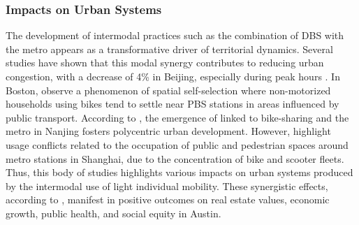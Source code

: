 \begin{refsegment}
\subsubsection*{Impacts on Urban Systems
    \label{chap2:impacts-urbain}
    }

The development of intermodal practices such as the combination of \acrshort{DBS} with the metro appears as a transformative driver of territorial dynamics. Several studies have shown that this modal synergy contributes to reducing urban congestion, with a decrease of 4\% in Beijing, especially during peak hours \textcolor{blue}{\autocite[12]{fan_dockless_2020}}. In Boston, \textcolor{blue}{\autocite[13]{basu_planning_2021}} observe a phenomenon of spatial self-selection where non-motorized households using bikes tend to settle near \acrshort{PBS} stations in areas influenced by public transport. According to \textcolor{blue}{\autocite[9-10]{yang_spatiotemporal_2019}}, the emergence of  linked to bike-sharing and the metro in Nanjing fosters polycentric urban development. However, \textcolor{blue}{\autocite[9]{yu_policy_2021}} highlight usage conflicts related to the occupation of public and pedestrian spaces around metro stations in Shanghai, due to the concentration of bike and scooter fleets. Thus, this body of studies highlights various impacts on urban systems produced by the intermodal use of light individual mobility. These synergistic effects, according to \textcolor{blue}{\autocite[3495]{li_exploring_2017}}, manifest in positive outcomes on real estate values, economic growth, public health, and social equity in Austin.%


\end{refsegment}
